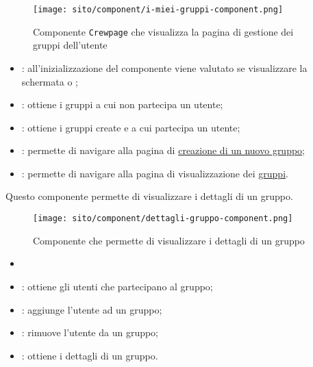 \begin{figure}[H]
    \centering
    \texttt{[image: sito/component/i-miei-gruppi-component.png]}
    \caption{Componente \texttt{Crewpage} che visualizza la pagina di gestione
        dei gruppi dell'utente}
\end{figure}


\begin{itemize}
    \item {}: all'inizializzazione del componente viene valutato
          se visualizzare la schermata  o
          ;
    \item {}: ottiene i gruppi a cui non partecipa un
          utente;
    \item {}:	ottiene i gruppi create e a cui partecipa un
          utente;
    \item {}: permette di navigare alla pagina di
          \hyperref[par:Crea nuovo gruppo]{creazione di un nuovo gruppo};
    \item {}: permette di navigare alla pagina di
          visualizzazione dei \hyperref[par:Gruppi]{gruppi}.
\end{itemize}

\label{par:CrewDetail}
Questo componente permette di visualizzare i dettagli di un gruppo.
\begin{figure}[H]
    \centering
    \texttt{[image: sito/component/dettagli-gruppo-component.png]}
    \caption{Componente che permette di visualizzare i dettagli di un gruppo}
\end{figure}
\begin{itemize}
    \item {}
\end{itemize}


\begin{itemize}
    \item {}: ottiene gli utenti che partecipano al
          gruppo;
    \item {}: aggiunge l'utente ad un gruppo;
    \item {}: rimuove l'utente da un gruppo;
    \item {}: ottiene i dettagli di un gruppo.
\end{itemize}

